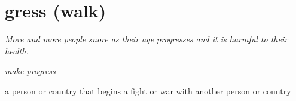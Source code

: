 \chapter{gress (walk)}

\begin{vocabulary}[progress]
    \textit{More and more people snore as their age progresses and it is harmful to their health.}

    \textit{make progress}
\end{vocabulary}

\begin{vocabulary}[aggressor]
    a person or country that begins a fight or war with another person or country
\end{vocabulary}